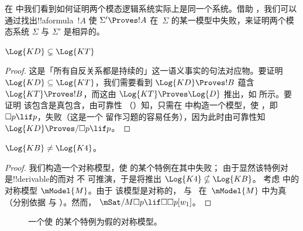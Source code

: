 \documentclass[../../../include/open-logic-section]{subfiles}
\begin{document}


在  中我们看到如何证明两个模态逻辑系统实际上是同一个系统。借助 ，我们可以通过找出!!a{formula}~$!A$ 使 $\Sigma' \Proves !A$ 在~$\Sigma$ 的某一模型中失败，来证明两个模态系统 $\Sigma$ 与 $\Sigma'$ 是相异的。

\begin{prop}
  $\Log{KD} \subsetneq \Log{KT}$
\end{prop}

\begin{proof} 这是「所有自反关系都是持续的」这一语义事实的句法对应物。要证明 $\Log{KD} \subseteq
  \Log{KT}$，我们需要看到 $\Log{KD} \Proves !B$ 蕴含
  $\Log{KT} \Proves !B$，而这由 $\Log{KT} \Proves
  \Log{D}$ 推出，如
   所示。要证明
  该包含是真包含，由可靠性
  （）知，只需在
   中构造一个模型，使 ，即 $\Box p \lif p$，失败（这是一个
  留作习题的容易任务），因为此时由可靠性知 $\Log{KD}
  \Proves/ \Box p \lif p$。
\end{proof}

\begin{prop}
  $\Log{KB} \neq \Log{K4}$。
\end{prop}

\begin{proof}
  我们构造一个对称模型，使  的某个特例在其中失败；
  由于显然该特例对  是!!{derivable}的而对  不
  可推演，于是将推出 $\Log{K4} \nsubseteq \Log{KB}$。
  考虑  中的对称模型 $\mModel{M}$。由于
  该模型是对称的， 与~ 在~$\mModel{M}$ 中为真
  （分别依据  与
  ）。然而，
  $\mSat/{M}{\Box p \lif \Box\Box p}[w_1]$。
\end{proof}

\begin{figure}[htpb]
  \centering
  \caption{一个使  的某个特例为假的对称模型。}
\end{figure}
\end{document}
